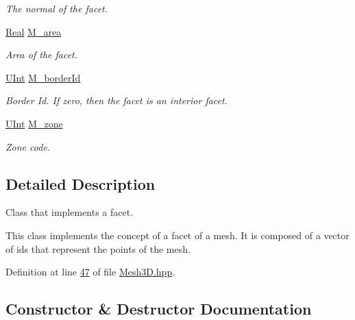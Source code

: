 \begin{DoxyCompactItemize}
\begin{DoxyCompactList}\small\item\em The normal of the facet. \end{DoxyCompactList}\item 
\hyperlink{namespaceFVCode3D_a40c1f5588a248569d80aa5f867080e83}{Real} \hyperlink{classFVCode3D_1_1Mesh3D_1_1Facet3D_a464195f44615c5dcba666c6ec3fde430}{M\+\_\+area}
\begin{DoxyCompactList}\small\item\em Area of the facet. \end{DoxyCompactList}\item 
\hyperlink{namespaceFVCode3D_a4bf7e328c75d0fd504050d040ebe9eda}{U\+Int} \hyperlink{classFVCode3D_1_1Mesh3D_1_1Facet3D_ad113bfcfe986c011457bfde02c6016a8}{M\+\_\+border\+Id}
\begin{DoxyCompactList}\small\item\em Border Id. If zero, then the facet is an interior facet. \end{DoxyCompactList}\item 
\hyperlink{namespaceFVCode3D_a4bf7e328c75d0fd504050d040ebe9eda}{U\+Int} \hyperlink{classFVCode3D_1_1Mesh3D_1_1Facet3D_afdbaf5ef57c9020b773f4fcf1e6131bb}{M\+\_\+zone}
\begin{DoxyCompactList}\small\item\em Zone code. \end{DoxyCompactList}\end{DoxyCompactItemize}


\subsection{Detailed Description}
Class that implements a facet. 

This class implements the concept of a facet of a mesh. It is composed of a vector of ids that represent the points of the mesh. 

Definition at line \hyperlink{Mesh3D_8hpp_source_l00047}{47} of file \hyperlink{Mesh3D_8hpp_source}{Mesh3\+D.\+hpp}.



\subsection{Constructor \& Destructor Documentation}
